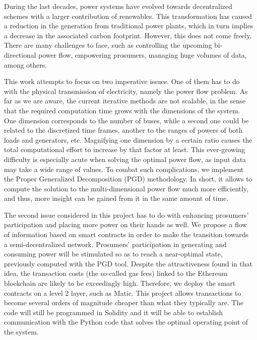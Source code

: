 During the last decades, power systems have evolved towards decentralized schemes with a larger contribution of renewables. This transformation has caused a reduction in the generation from traditional power plants, which in turn implies a decrease in the associated carbon footprint. However, this does not come freely. There are many challenges to face, such as controlling the upcoming bi-directional power flow, empowering prosumers, managing huge volumes of data, among others.

This work attempts to focus on two imperative issues. One of them has to do with the physical transmission of electricity, namely the power flow problem. As far as we are aware, the current iterative methods are not scalable, in the sense that the required computation time grows with the dimensions of the system. One dimension corresponds to the number of buses, while a second one could be related to the discretized time frames, another to the ranges of powers of both loads and generators, etc. Magnifying one dimension by a certain ratio causes the total computational effort to increase by that factor at least. This ever-growing difficulty is especially acute when solving the optimal power flow, as input data may take a wide range of values. To combat such complications, we implement the Proper Generalized Decomposition (PGD) methodology. In short, it allows to compute the solution to the multi-dimensional power flow much more efficiently, and thus, more insight can be gained from it in the same amount of time. 

The second issue considered in this project has to do with enhancing prosumers' participation and placing more power on their hands as well. We propose a flow of information based on smart contracts in order to make the transition towards a semi-decentralized network. Prosumers' participation in generating and consuming power will be stimulated so as to reach a near-optimal state, previously computed with the PGD tool. Despite the attractiveness found in that idea, the transaction costs (the so-called gas fees) linked to the Ethereum blockchain are likely to be exceedingly high. Therefore, we deploy the smart contracts on a level 2 layer, such as Matic. This project allows transactions to become several orders of magnitude cheaper than what they typically are. The code will still be programmed in Solidity and it will be able to establish communication with the Python code that solves the optimal operating point of the system. 

